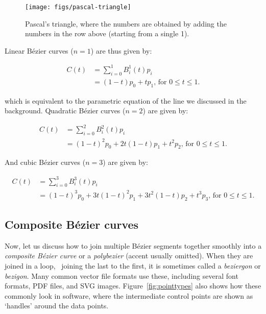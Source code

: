 \begin{figure}
\centering
\texttt{[image: figs/pascal-triangle]}
\caption{Pascal's triangle, where the numbers are obtained by adding the numbers in the row above (starting from a single 1).}%
\label{fig:pascal}
\end{figure}

Linear B\'ezier curves (\(n = 1\)) are thus given by:

\begin{align}
\label{eq:bezier1}
C(t) &= \sum_{i=0}^1 B^1_i(t) p_i \nonumber \\
&= (1-t) p_0 + t p_1\text{, for }0 \leq t \leq 1.
\end{align}

which is equivalent to the parametric equation of the line we discussed in the background.
Quadratic B\'ezier curves (\(n = 2\)) are given by:

\begin{align}
\label{eq:bezier2}
C(t) &= \sum_{i=0}^2 B^2_i(t) p_i \nonumber \\
&= (1-t)^2 p_0 + 2 t (1-t) p_1 + t^2 p_2\text{, for }0 \leq t \leq 1.
\end{align}

And cubic B\'ezier curves (\(n = 3\)) are given by:

\begin{small}
\begin{align}
\label{eq:bezier3}
C(t) &= \sum_{i=0}^3 B^3_i(t) p_i \nonumber \\
&= (1-t)^3 p_0 + 3 t (1-t)^2 p_1 + 3 t^2 (1-t) p_2 + t^3 p_3\text{, for }0 \leq t \leq 1.
\end{align}
\end{small}

\subsection{Composite B\'ezier curves}

Now, let us discuss how to join multiple B\'ezier segments together smoothly into a \emph{composite B\'ezier curve} or a \emph{polybezier} (accent usually omitted).
When they are joined in a loop, \ie\ joining the last to the first, it is sometimes called a \emph{beziergon} or \emph{bezigon}.
Many common vector file formats use these, including several font formats, PDF files, and SVG images.
Figure~\ref{fig:pointtypes} also shows how these commonly look in software, where the intermediate control points are shown as `handles' around the data points.

